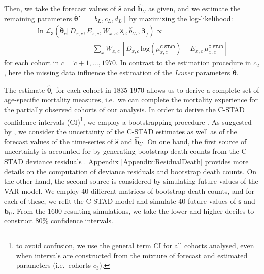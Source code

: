 \documentclass[11pt, a4paper]{article}
\begin{document}
Then, we take the forecast values of $\hat{\bm{s}}$ and $\hat{\bm{b}}_U$ as given, and we estimate the remaining parameters $\breve{\bm{\theta}}'=\left[b_{L},c_{L},d_{L}\right]$ by maximizing the log-likelihood:
%
\begin{equation}\label{Eq:loglikeC3}
\begin{aligned}
\ln\mathcal{L}_3\left(\breve{\bm{\theta}}_c | \, D_{x,c} , E_{x,c} , W_{x,c} , \hat{s}_{c}, \hat{b}_{U_{c}} , \bm{\beta}_{f} \right) \propto \qquad\qquad\qquad\qquad \\ \qquad\qquad\qquad\qquad \sum_{x} W_{x,c} \, \left[  D_{x,c} \,
\mathrm{log} \left( \mu^{\texttt{C-STAD}}_{x,c}  \right) - E_{x,c}
\, \mu^{\texttt{C-STAD}}_{x,c} \right] 
\end{aligned}
\end{equation}
%
for each cohort in $c=\tilde{c}+1,\ldots,1970$. In contrast to the estimation procedure in $c_2$, here the missing data influence the estimation of the \textit{Lower} parameters $\breve{\bm{\theta}}$. \par

The estimate $\hat{\bm{\theta}}_c$ for each cohort in 1835-1970 allows us to derive a complete set of age-specific mortality measures, i.e.~we can complete the mortality experience for the partially observed cohorts of our analysis. In order to derive the C-STAD confidence intervals (CI)\footnote{to avoid confusion, we use the general term CI for all cohorts analysed, even when intervals are constructed from the mixture of forecast and estimated parameters (i.e.~cohorts $c_3$).}, we employ a bootstrapping procedure \citep{efron1994introduction}. As suggested by \cite{keilman2006prediction}, we consider the uncertainty of the C-STAD estimates as well as of the forecast values of the time-series of $\hat{\bm{s}}$ and $\hat{\bm{b}}_U$. On one hand, the first source of uncertainty is accounted for by generating bootstrap death counts from the C-STAD deviance residuals \cite[as in, for example,][]{koissi2006evaluating,renshaw2008simulation,ouellette2012regional}. Appendix \ref{Appendix:ResidualDeath} provides more details on the computation of deviance residuals and bootstrap death counts. On the other hand, the second source is considered by simulating future values of the VAR model. We employ 40 different matrices of bootstrap death counts, and for each of these, we refit the C-STAD model and simulate 40 future values of $\bm{s}$ and $\bm{b}_U$. From the 1600 resulting simulations, we take the lower and higher deciles to construct 80\% confidence intervals.
\end{document}
